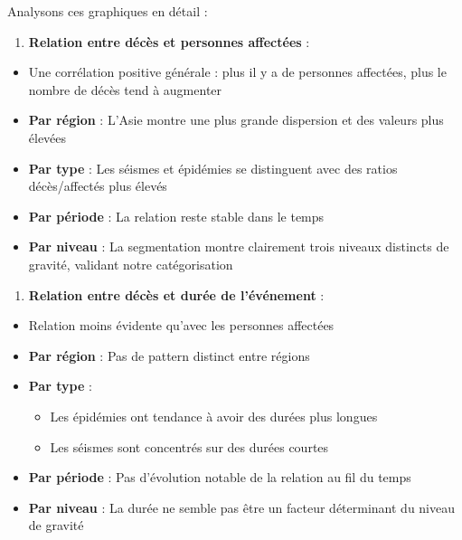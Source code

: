 \documentclass[
]{article}
\providecommand{\tightlist}{%
  \setlength{\itemsep}{0pt}\setlength{\parskip}{0pt}}
\begin{document}
Analysons ces graphiques en détail :

\begin{enumerate}
\def\labelenumi{\arabic{enumi}.}
\tightlist
\item
  \textbf{Relation entre décès et personnes affectées} :
\end{enumerate}

\begin{itemize}
\tightlist
\item
  Une corrélation positive générale : plus il y a de personnes
  affectées, plus le nombre de décès tend à augmenter
\item
  \textbf{Par région} : L'Asie montre une plus grande dispersion et des
  valeurs plus élevées
\item
  \textbf{Par type} : Les séismes et épidémies se distinguent avec des
  ratios décès/affectés plus élevés
\item
  \textbf{Par période} : La relation reste stable dans le temps
\item
  \textbf{Par niveau} : La segmentation montre clairement trois niveaux
  distincts de gravité, validant notre catégorisation
\end{itemize}

\begin{enumerate}
\def\labelenumi{\arabic{enumi}.}
\setcounter{enumi}{1}
\tightlist
\item
  \textbf{Relation entre décès et durée de l'événement} :
\end{enumerate}

\begin{itemize}
\tightlist
\item
  Relation moins évidente qu'avec les personnes affectées
\item
  \textbf{Par région} : Pas de pattern distinct entre régions
\item
  \textbf{Par type} :

  \begin{itemize}
  \tightlist
  \item
    Les épidémies ont tendance à avoir des durées plus longues
  \item
    Les séismes sont concentrés sur des durées courtes
  \end{itemize}
\item
  \textbf{Par période} : Pas d'évolution notable de la relation au fil
  du temps
\item
  \textbf{Par niveau} : La durée ne semble pas être un facteur
  déterminant du niveau de gravité
\end{itemize}
\end{document}
